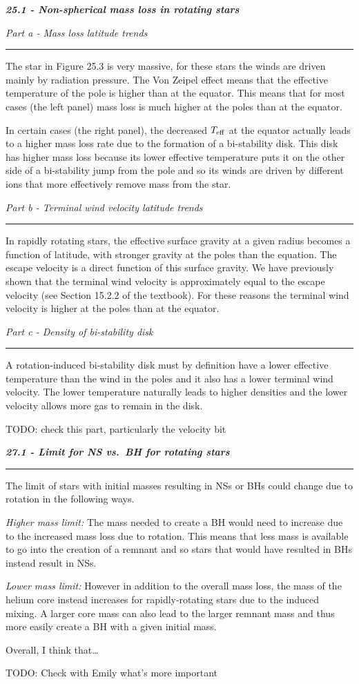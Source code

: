 \documentclass[12pt, letterpaper, twoside]{article}
\newcommand{\question}[1]{{\noindent \it #1}}
\newcommand{\answer}[1]{
    \par\noindent\rule{\textwidth}{0.4pt}#1\vspace{0.5cm}
}
\newcommand{\todo}[1]{{\color{red}\begin{center}TODO: #1\end{center}}}
\begin{document}
\question{\textbf{25.1 - Non-spherical mass loss in rotating stars}}

\question{Part a - Mass loss latitude trends}
\answer{
    The star in Figure 25.3 is very massive, for these stars the winds are driven mainly by radiation pressure. The Von Zeipel effect means that the effective temperature of the pole is higher than at the equator. This means that for most cases (the left panel) mass loss is much higher at the poles than at the equator.

    In certain cases (the right panel), the decreased $T_{\rm eff}$ at the equator actually leads to a higher mass loss rate due to the formation of a bi-stability disk. This disk has higher mass loss because its lower effective temperature puts it on the other side of a bi-stability jump from the pole and so its winds are driven by different ions that more effectively remove mass from the star.
}

\question{Part b - Terminal wind velocity latitude trends}
\answer{
    In rapidly rotating stars, the effective surface gravity at a given radius becomes a function of latitude, with stronger gravity at the poles than the equation. The escape velocity is a direct function of this surface gravity. We have previously shown that the terminal wind velocity is approximately equal to the escape velocity (see Section 15.2.2 of the textbook). For these reasons the terminal wind velocity is higher at the poles than at the equator.
}

\question{Part c - Density of bi-stability disk}
\answer{
    A rotation-induced bi-stability disk must by definition have a lower effective temperature than the wind in the poles and it also has a lower terminal wind velocity. The lower temperature naturally leads to higher densities and the lower velocity allows more gas to remain in the disk.
    \todo{check this part, particularly the velocity bit}
}

\question{\textbf{27.1 - Limit for NS vs.\ BH for rotating stars}}
\answer{
    The limit of stars with initial masses resulting in NSs or BHs could change due to rotation in the following ways.

    \textit{Higher mass limit:} The mass needed to create a BH would need to increase due to the increased mass loss due to rotation. This means that less mass is available to go into the creation of a remnant and so stars that would have resulted in BHs instead result in NSs.

    \textit{Lower mass limit:} However in addition to the overall mass loss, the mass of the helium core instead increases for rapidly-rotating stars due to the induced mixing. A larger core mass can also lead to the larger remnant mass and thus more easily create a BH with a given initial mass.

    Overall, I think that\dots
    \todo{Check with Emily what's more important}
}
\end{document}
